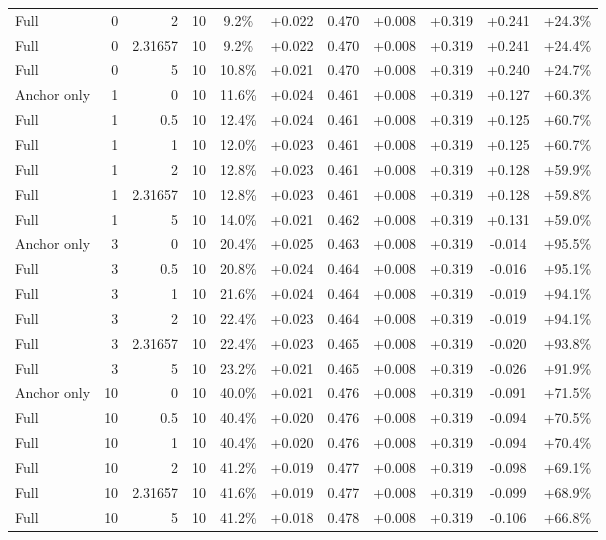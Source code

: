 \begin{table}[htbp]
\begin{tabular}{lrrrccccccc}
Full & 0 & 2 & 10 & 9.2\% & +0.022 & 0.470 & +0.008 & +0.319 & +0.241 & +24.3\% \\
Full & 0 & 2.31657 & 10 & 9.2\% & +0.022 & 0.470 & +0.008 & +0.319 & +0.241 & +24.4\% \\
Full & 0 & 5 & 10 & 10.8\% & +0.021 & 0.470 & +0.008 & +0.319 & +0.240 & +24.7\% \\
Anchor only & 1 & 0 & 10 & 11.6\% & +0.024 & 0.461 & +0.008 & +0.319 & +0.127 & +60.3\% \\
Full & 1 & 0.5 & 10 & 12.4\% & +0.024 & 0.461 & +0.008 & +0.319 & +0.125 & +60.7\% \\
Full & 1 & 1 & 10 & 12.0\% & +0.023 & 0.461 & +0.008 & +0.319 & +0.125 & +60.7\% \\
Full & 1 & 2 & 10 & 12.8\% & +0.023 & 0.461 & +0.008 & +0.319 & +0.128 & +59.9\% \\
Full & 1 & 2.31657 & 10 & 12.8\% & +0.023 & 0.461 & +0.008 & +0.319 & +0.128 & +59.8\% \\
Full & 1 & 5 & 10 & 14.0\% & +0.021 & 0.462 & +0.008 & +0.319 & +0.131 & +59.0\% \\
Anchor only & 3 & 0 & 10 & 20.4\% & +0.025 & 0.463 & +0.008 & +0.319 & -0.014 & +95.5\% \\
Full & 3 & 0.5 & 10 & 20.8\% & +0.024 & 0.464 & +0.008 & +0.319 & -0.016 & +95.1\% \\
Full & 3 & 1 & 10 & 21.6\% & +0.024 & 0.464 & +0.008 & +0.319 & -0.019 & +94.1\% \\
Full & 3 & 2 & 10 & 22.4\% & +0.023 & 0.464 & +0.008 & +0.319 & -0.019 & +94.1\% \\
Full & 3 & 2.31657 & 10 & 22.4\% & +0.023 & 0.465 & +0.008 & +0.319 & -0.020 & +93.8\% \\
Full & 3 & 5 & 10 & 23.2\% & +0.021 & 0.465 & +0.008 & +0.319 & -0.026 & +91.9\% \\
Anchor only & 10 & 0 & 10 & 40.0\% & +0.021 & 0.476 & +0.008 & +0.319 & -0.091 & +71.5\% \\
Full & 10 & 0.5 & 10 & 40.4\% & +0.020 & 0.476 & +0.008 & +0.319 & -0.094 & +70.5\% \\
Full & 10 & 1 & 10 & 40.4\% & +0.020 & 0.476 & +0.008 & +0.319 & -0.094 & +70.4\% \\
Full & 10 & 2 & 10 & 41.2\% & +0.019 & 0.477 & +0.008 & +0.319 & -0.098 & +69.1\% \\
Full & 10 & 2.31657 & 10 & 41.6\% & +0.019 & 0.477 & +0.008 & +0.319 & -0.099 & +68.9\% \\
Full & 10 & 5 & 10 & 41.2\% & +0.018 & 0.478 & +0.008 & +0.319 & -0.106 & +66.8\% \\

\end{tabular}
\end{table}

